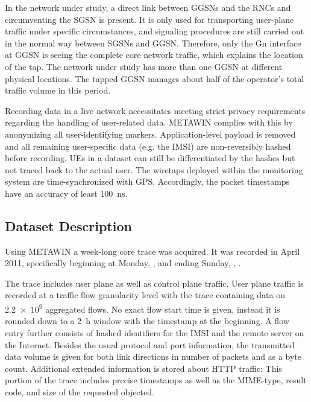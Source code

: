 In the network under study, a direct link between \glspl{GGSN} and the \glspl{RNC} and circumventing the \gls{SGSN} is present. It is only used for transporting user-plane traffic under specific circumstances, and signaling procedures are still carried out in the normal way between \glspl{SGSN} and \gls{GGSN}. Therefore, only the Gn interface at \gls{GGSN} is seeing the complete core network traffic, which explains the location of the tap. The network under study has more than one \gls{GGSN} at different physical locations. The tapped \gls{GGSN} manages about half of the operator's total traffic volume in this period. 

Recording data in a live network necessitates meeting strict privacy requirements regarding the handling of user-related data. \acrshort{METAWIN} complies with this by anonymizing all user-identifying markers. Application-level payload is removed and all remaining user-specific data (e.g. the \gls{IMSI}) are non-reversibly hashed before recording. \glspl{UE} in a dataset can still be differentiated by the hashes but not traced back to the actual user. The wiretaps deployed within the monitoring system are time-synchronized with \gls{GPS}. Accordingly, the packet timestamps have an accuracy of least \SI{100}{\nano\second}.


\subsection{Dataset Description}

Using \acrshort{METAWIN} a week-long core trace was acquired. It was recorded in April 2011, specifically beginning at Monday, \yyyymmdddate{},  and ending Sunday, , .

The trace includes user plane as well as control plane traffic. User plane traffic is recorded at a traffic flow granularity level with the trace containing data on \num{2.2e9} aggregated flows. No exact flow start time is given, instead it is rounded down to a \SI{2}{\hour} window with the timestamp at the beginning. 
A flow entry further consists of hashed identifiers for the \gls{IMSI} and the remote server on the Internet. Besides the usual protocol and port information, the transmitted data volume is given for both link directions in number of packets and as a byte count. Additional extended information is stored about \gls{HTTP} traffic: This portion of the trace includes precise timestamps as well as the \acrshort{MIME}-type, result code, and size of the requested objected.

